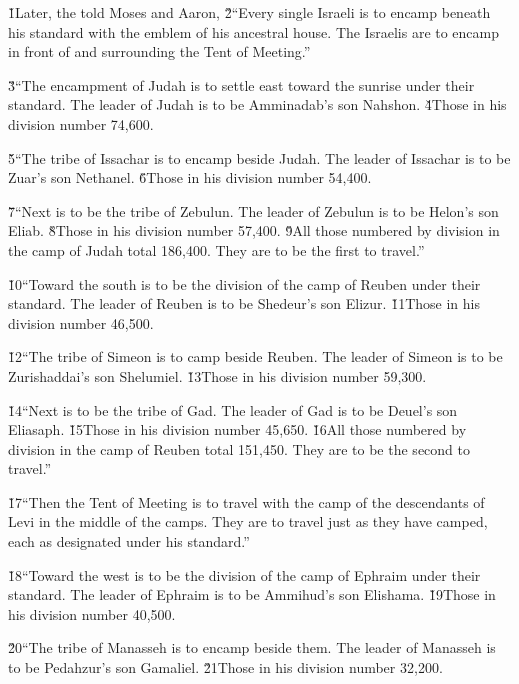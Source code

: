 \v{1}Later, the  told Moses and Aaron, \v{2}``Every single Israeli is to encamp beneath his standard with the emblem of his ancestral house. The Israelis are to encamp in front of and surrounding the Tent of Meeting.''

\v{3}``The encampment of Judah is to settle east toward the sunrise under their standard. The leader of Judah is to be Amminadab's son Nahshon. \v{4}Those in his division number 74,600.

\v{5}``The tribe of Issachar is to encamp beside Judah. The leader of Issachar is to be Zuar's son Nethanel. \v{6}Those in his division number 54,400.

\v{7}``Next is to be the tribe of Zebulun. The leader of Zebulun is to be Helon's son Eliab. \v{8}Those in his division number 57,400. \v{9}All those numbered by division in the camp of Judah total 186,400. They are to be the first to travel.''

\v{10}``Toward the south is to be the division of the camp of Reuben under their standard. The leader of Reuben is to be Shedeur's son Elizur. \v{11}Those in his division number 46,500.

\v{12}``The tribe of Simeon is to camp beside Reuben. The leader of Simeon is to be Zurishaddai's son Shelumiel. \v{13}Those in his division number 59,300.

\v{14}``Next is to be the tribe of Gad. The leader of Gad is to be Deuel's son Eliasaph. \v{15}Those in his division number 45,650. \v{16}All those numbered by division in the camp of Reuben total 151,450. They are to be the second to travel.''

\v{17}``Then the Tent of Meeting is to travel with the camp of the descendants of Levi in the middle of the camps. They are to travel just as they have camped, each as designated under his standard.''

\v{18}``Toward the west is to be the division of the camp of Ephraim under their standard. The leader of Ephraim is to be Ammihud's son Elishama. \v{19}Those in his division number 40,500.

\v{20}``The tribe of Manasseh is to encamp beside them. The leader of Manasseh is to be Pedahzur's son Gamaliel. \v{21}Those in his division number 32,200.

